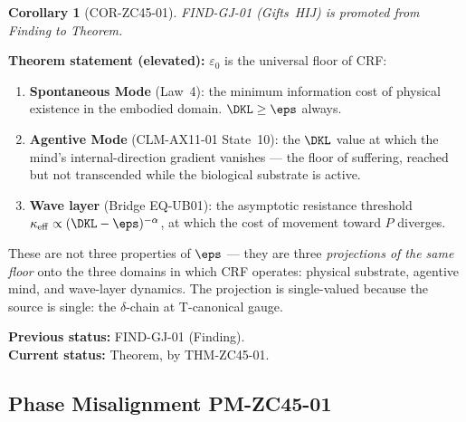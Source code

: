 \documentclass[12pt, a4paper]{article}
\newtheorem{corollary}{Corollary}[section]
\begin{document}
\begin{derivedbox}[title={COR-ZC45-01: FIND-GJ-01 Promoted
  to Theorem --- $\varepsilon_0$ as Universal Floor}]

\begin{corollary}[COR-ZC45-01]
\label{cor:zc45-01}
FIND-GJ-01 (Gifts~HIJ) is promoted from Finding to Theorem.
\end{corollary}

\textbf{Theorem statement (elevated):}
$\varepsilon_0$ is the universal floor of CRF:
\begin{enumerate}[leftmargin=*, noitemsep, itemsep=3pt]
\item \textbf{Spontaneous Mode} (Law~4):
  the minimum information cost of physical existence in the
  embodied domain. $\DKL \geq \eps$ always.
\item \textbf{Agentive Mode} (CLM-AX11-01 State~10):
  the $\DKL$ value at which the mind's internal-direction
  gradient vanishes --- the floor of suffering, reached but
  not transcended while the biological substrate is active.
\item \textbf{Wave layer} (Bridge EQ-UB01):
  the asymptotic resistance threshold
  $\kappa_{\mathrm{eff}} \propto (\DKL - \eps)^{-\alpha}$,
  at which the cost of movement toward $P$ diverges.
\end{enumerate}

These are not three properties of $\eps$ --- they are three
\emph{projections of the same floor} onto the three domains
in which CRF operates: physical substrate, agentive mind,
and wave-layer dynamics. The projection is single-valued
because the source is single: the $\delta$-chain at
T-canonical gauge.

\textbf{Previous status:} FIND-GJ-01 (Finding).\\
\textbf{Current status:} Theorem, by THM-ZC45-01.
\end{derivedbox}

\subsection{Phase Misalignment PM-ZC45-01}

\end{document}
